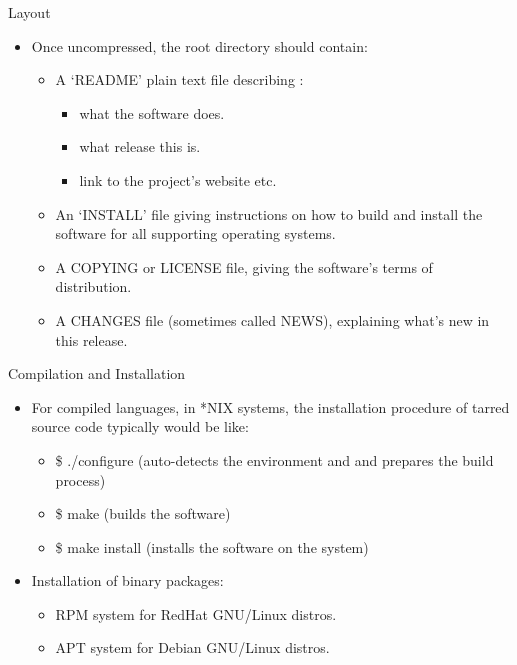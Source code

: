 \documentclass{beamer}
\begin{document}
\begin{frame}{Layout}
\begin{itemize}
	\item Once uncompressed, the root directory should contain:
	\begin{itemize}
		\item A `README' plain text file describing :
			\begin{itemize}
				\item what the software does.
				\item what release this is.
				\item link to the project's website etc.
			\end{itemize}
		\item An `INSTALL' file giving instructions on how to build and install the software for all supporting operating systems.
		\item A COPYING or LICENSE file, giving the software's terms of distribution. 
		\item A CHANGES file (sometimes called NEWS), explaining what's new in this release.
	\end{itemize}
\end{itemize}
\end{frame}

\begin{frame}{Compilation and Installation}
\begin{itemize}
	\item For compiled languages, in *NIX systems, the installation procedure of tarred source code typically would be like: 
	\begin{itemize}
		\item \$ ./configure (auto-detects the environment and and prepares the build process)
		\item \$ make (builds the software)
		\item \$ make install (installs the software on the system)
	\end{itemize}
	\item Installation of binary packages:
	\begin{itemize}
		\item RPM system for RedHat GNU/Linux distros. 
		\item APT system for Debian GNU/Linux distros. 
	\end{itemize}
\end{itemize}
\end{frame}
\end{document}
